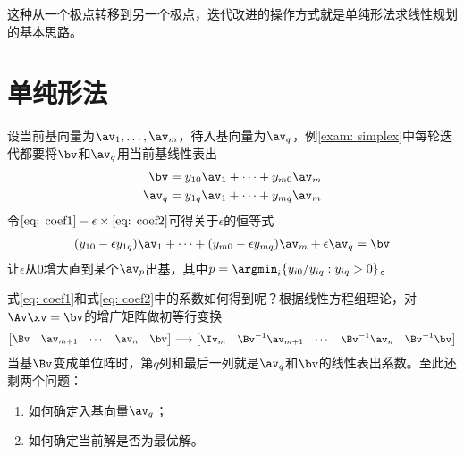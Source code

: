 \documentclass{ctexart}
\begin{document}
这种从一个极点转移到另一个极点，迭代改进的操作方式就是单纯形法求线性规划的基本思路。

\section{单纯形法}

设当前基向量为$\av_1, \ldots, \av_m$，待入基向量为$\av_q$，例\ref{exam: simplex}中每轮迭代都要将$\bv$和$\av_q$用当前基线性表出
\begin{align}
    \label{eq: coef1}
    \bv   & = y_{10} \av_1 + \cdots + y_{m0} \av_m \\
    \label{eq: coef2}
    \av_q & = y_{1q} \av_1 + \cdots + y_{mq} \av_m
\end{align}
令$\eqref{eq: coef1} - \epsilon \times \eqref{eq: coef2}$可得关于$\epsilon$的恒等式
\begin{align*}
    (y_{10} - \epsilon y_{1q}) \av_1 + \cdots + (y_{m0} - \epsilon y_{mq}) \av_m + \epsilon \av_q = \bv
\end{align*}
让$\epsilon$从$0$增大直到某个$\av_p$出基，其中$p = \argmin_i \{ y_{i0} / y_{iq} : y_{iq} > 0 \}$。

式\eqref{eq: coef1}和式\eqref{eq: coef2}中的系数如何得到呢？根据线性方程组理论，对$\Av \xv = \bv$的增广矩阵做初等行变换
\begin{align*}
    \begin{bmatrix}
        \Bv & \av_{m+1} & \cdots & \av_n & \bv
    \end{bmatrix} \longrightarrow
    \begin{bmatrix}
        \Iv_m & \Bv^{-1} \av_{m+1} & \cdots & \Bv^{-1} \av_n & \Bv^{-1} \bv
    \end{bmatrix}
\end{align*}
当基$\Bv$变成单位阵时，第$q$列和最后一列就是$\av_q$和$\bv$的线性表出系数。至此还剩两个问题：
\begin{enumerate}
    \item 如何确定入基向量$\av_q$；
    \item 如何确定当前解是否为最优解。
\end{enumerate}
\end{document}
